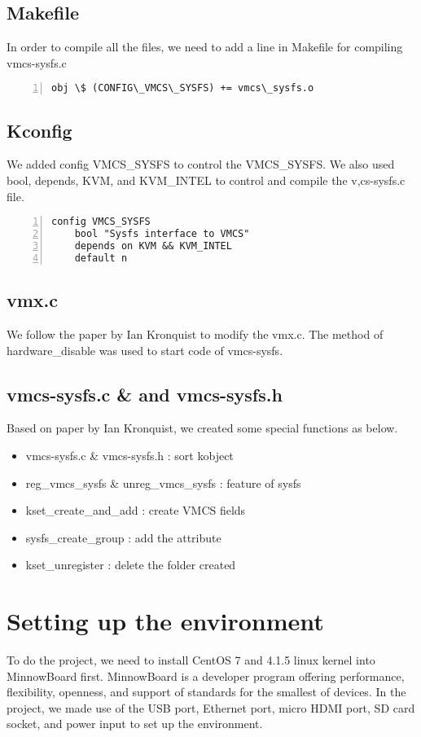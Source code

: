 \documentclass[10pt,draftclsnofoot,journal,compsoc,onecolumn]{IEEEtran}
\begin{document}
\subsection{Makefile}
In order to compile all the files, we need to add a line in Makefile for compiling vmcs-sysfs.c 
\begin{lstlisting}[numbers=left]
obj \$ (CONFIG\_VMCS\_SYSFS) += vmcs\_sysfs.o
\end{lstlisting}

\subsection{Kconfig}
We added config VMCS\_SYSFS to control the VMCS\_SYSFS. We also used bool, depends, KVM, and KVM\_INTEL to control and compile the v,cs-sysfs.c file.

\begin{lstlisting}[numbers=left] 
config VMCS_SYSFS
	bool "Sysfs interface to VMCS"
	depends on KVM && KVM_INTEL
	default n
\end{lstlisting} 

\subsection{vmx.c}
We follow the paper by Ian Kronquist to modify the vmx.c. The method of hardware\_disable was used to start code of vmcs-sysfs. 

\subsection{vmcs-sysfs.c \& and vmcs-sysfs.h}
Based on paper by Ian Kronquist, we created some special functions as below.
\begin{itemize}
\item vmcs-sysfs.c \& vmcs-sysfs.h : sort kobject
\item reg\_vmcs\_sysfs \& unreg\_vmcs\_sysfs : feature of sysfs
\item kset\_create\_and\_add : create VMCS fields
\item sysfs\_create\_group : add the attribute
\item kset\_unregister : delete the folder created
\end{itemize}

\section{Setting up the environment}
	To do the project, we need to install CentOS 7 and 4.1.5 linux kernel into MinnowBoard first. MinnowBoard is a developer program offering performance, flexibility, openness, and support of standards for the smallest of devices. In the project, we made use of the USB port, Ethernet port, micro HDMI port, SD card socket, and power input to set up the environment. 
\end{document}

